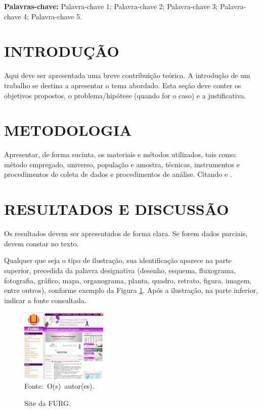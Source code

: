 \documentclass{furgmpu}
\newcommand{\palavraschave}[1]{\noindent\textbf{Palavras-chave:} #1.\vspace{0.2cm}\renewcommand{\baselinestretch}{1.07}}
\begin{document}
\maketitle

\palavraschave{Palavra-chave 1; Palavra-chave 2; Palavra-chave 3; Palavra-chave 4; Palavra-chave 5}

\section{INTRODUÇÃO}

Aqui deve ser apresentada uma breve contribuição teórica. A introdução de um trabalho se destina a apresentar o tema abordado. Esta seção deve conter os objetivos propostos, o problema/hipótese (quando for o caso) e a justificativa.

\section{METODOLOGIA}

Apresentar, de forma sucinta, os materiais e métodos utilizados, tais como: método empregado, universo, população e amostra, técnicas, instrumentos e procedimentos de coleta de dados e procedimentos de análise. Citando \cite{exemplo01} e \cite{exemplo02}.

\section{RESULTADOS E DISCUSSÃO}

Os resultados devem ser apresentados de forma clara. Se forem dados parciais, devem constar no texto.

Qualquer que seja o tipo de ilustração, sua identificação aparece na parte superior, precedida da palavra designativa (desenho, esquema, fluxograma, fotografia, gráfico, mapa, organograma, planta, quadro, retrato, figura, imagem, entre outros), conforme exemplo da Figura \ref{fig:exemplo}. Após a ilustração, na parte inferior, indicar a fonte consultada.

\begin{figure}[ht]
	\centering
	\caption{Site da FURG.}
	\includegraphics[width=4.13cm,scale=1]{img.jpg}\\
	\mbox{Fonte: O(s) autor(es).}
	\label{fig:exemplo}
\end{figure}
\end{document}
